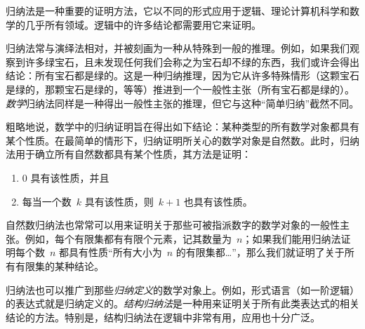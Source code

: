 \documentclass[../../../include/open-logic-section]{subfiles}
\begin{document}


归纳法是一种重要的证明方法，它以不同的形式应用于逻辑、理论计算机科学和数学的几乎所有领域。逻辑中的许多结论都需要用它来证明。

归纳法常与演绎法相对，并被刻画为一种从特殊到一般的推理。例如，如果我们观察到许多绿宝石，且未发现任何我们会称之为宝石却不绿的东西，我们或许会得出结论：所有宝石都是绿的。这是一种归纳推理，因为它从许多特殊情形（这颗宝石是绿的，那颗宝石是绿的，等等）推进到一个一般性主张（所有宝石都是绿的）。\emph{数学}归纳法同样是一种得出一般性主张的推理，但它与这种“简单归纳”截然不同。

粗略地说，数学中的归纳证明旨在得出如下结论：某种类型的所有数学对象都具有某个性质。在最简单的情形下，归纳证明所关心的数学对象是自然数。此时，归纳法用于确立所有自然数都具有某个性质，其方法是证明：

\begin{enumerate}
    \item $0$ 具有该性质，并且
    \item 每当一个数~$k$ 具有该性质，则~$k+1$ 也具有该性质。
\end{enumerate}

自然数归纳法也常常可以用来证明关于那些可被指派数字的数学对象的一般性主张。例如，每个有限集都有有限个元素，记其数量为~$n$；如果我们能用归纳法证明每个数~$n$ 都具有性质“所有大小为~$n$ 的有限集都\ldots”，那么我们就证明了关于所有有限集的某种结论。

归纳法也可以推广到那些\emph{归纳定义}的数学对象上。例如，形式语言（如一阶逻辑）的表达式就是归纳定义的。\emph{结构归纳法}是一种用来证明关于所有此类表达式的相关结论的方法。特别是，结构归纳法在逻辑中非常有用，应用也十分广泛。
\end{document}
